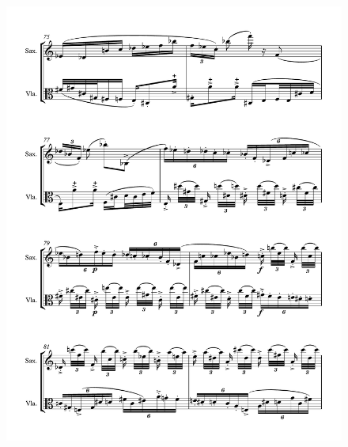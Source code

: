 \begin{figure}[htbp]
    \centering
	\includegraphics[width=6.5in]{figures/Sax_Viola_28.pdf}
\end{figure}

